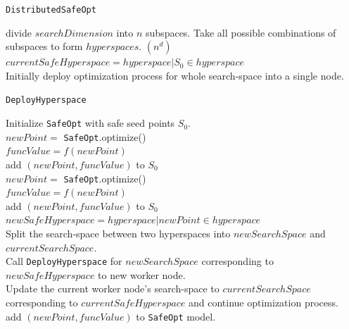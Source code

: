 \begin{algorithm}[h!]
	\caption{\texttt{DistributedSafeOpt}}
	\label{alg:dsbo}
	{
		divide $searchDimension$ into $n$ subspaces.
	}
	Take all possible combinations of subspaces to form $hyperspaces$. $(n^d)$\\
	$currentSafeHyperspace = hyperspace | S_0 \in hyperspace$\\
	Initially deploy optimization process for whole search-space into a single node.\\		
\end{algorithm}

\begin{algorithm}[h!]
	\caption{\texttt{DeployHyperspace}}
	\label{alg:deployhs}
	Initialize \texttt{SafeOpt} with safe seed points $S_0$.\\
	{
		{
			$newPoint=$ \texttt{SafeOpt}.optimize()\\
			$funcValue=f(newPoint)$\\
			add $(newPoint,funcValue)$ to $S_0$\\
		}
		\KwRet{}
	}
	{
		$newPoint=$ \texttt{SafeOpt}.optimize()\\
		$funcValue=f(newPoint)$\\
		add $(newPoint,funcValue)$ to $S_0$\\
		$newSafeHyperspace = hyperspace | newPoint \in hyperspace$\\
		{
			Split the search-space between two hyperspaces into $newSearchSpace$ and $currentSearchSpace$.\\
			Call \texttt{DeployHyperspace} for $newSearchSpace$ corresponding to $newSafeHyperspace$ to new worker node.\\
			Update the current worker node's search-space to $currentSearchSpace$ corresponding to $currentSafeHyperspace$ and continue optimization process.\\
		}
		{
			add $(newPoint,funcValue)$ to \texttt{SafeOpt} model.\\
		}
	}
\end{algorithm}

